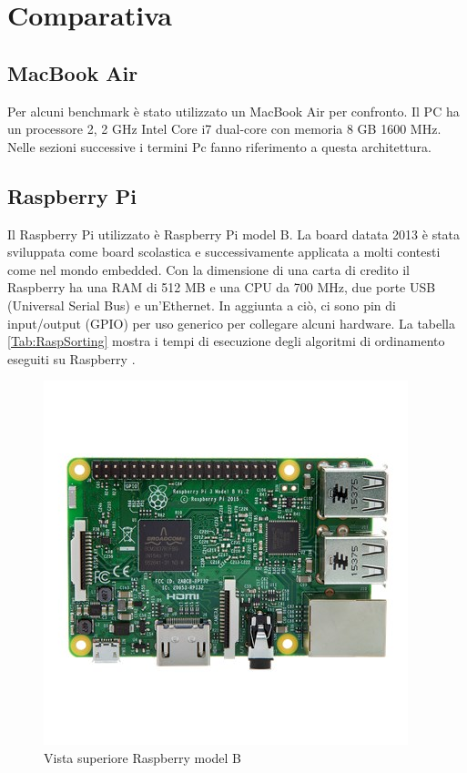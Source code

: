 \documentclass[12pt, a4paper]{report}
\begin{document}
\chapter{Comparativa}

\section*{MacBook Air}
\label{sec:MacBook}
Per alcuni benchmark è stato utilizzato un MacBook Air per confronto. Il PC ha un processore 2, 2 GHz Intel Core i7 dual-core con memoria 8 GB 1600 MHz. Nelle sezioni successive i termini Pc fanno riferimento a questa architettura.

\section*{Raspberry Pi}

Il Raspberry Pi utilizzato è Raspberry Pi model B. La board datata 2013 è stata sviluppata come board scolastica e successivamente applicata a molti contesti come nel mondo embedded.
Con la dimensione di una carta di credito il Raspberry ha una RAM di 512 MB e una CPU da 700 MHz, due porte USB (Universal Serial Bus) e un'Ethernet. In aggiunta a ciò, ci sono pin di input/output (GPIO) per uso generico per collegare alcuni hardware. La tabella \ref{Tab:RaspSorting} mostra i tempi di esecuzione degli algoritmi di ordinamento eseguiti su Raspberry \cite{Rasp}.

\begin{figure}[ht]
\centering
	\includegraphics[scale=0.5 ]{RBTop.jpeg}
	\caption{Vista superiore Raspberry model B}
	\label{fig:RaspberryB}
\end{figure}
\end{document}
